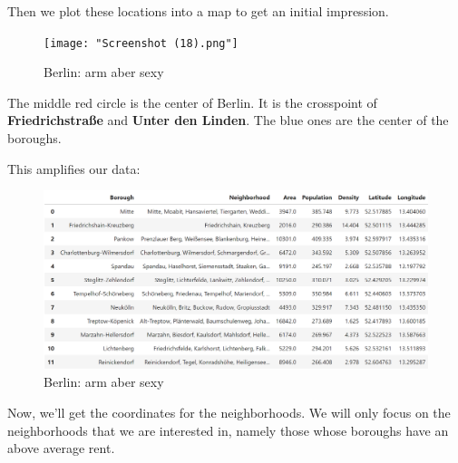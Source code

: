 \documentclass[11pt]{article}
\begin{document}
    Then we plot these locations into a map to get an initial impression.

    \begin{figure}
\centering
\texttt{[image: "Screenshot (18).png"]}
\caption{Berlin: arm aber sexy}
\end{figure}


        
    The middle red circle is the center of Berlin. It is the crosspoint of
\textbf{Friedrichstraße} and \textbf{Unter den Linden}. The blue ones are
the center of the boroughs.

    This amplifies our data:

     \begin{figure}
\centering
\includegraphics[scale=1.1]{"Screenshot (31).png"}
\caption{Berlin: arm aber sexy}
\end{figure}




    Now, we'll get the coordinates for the neighborhoods. We will only focus
    on the neighborhoods that we are interested in, namely those whose
boroughs have an above average rent.
\end{document}
